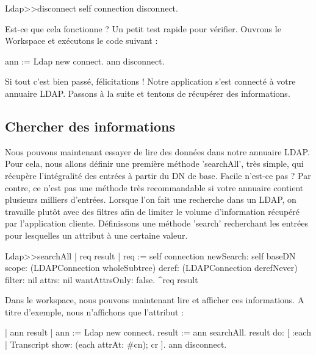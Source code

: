 \documentclass[a4paper,10pt,twoside]{book}
\begin{document}
\begin{code}{}
Ldap>>disconnect 
	self connection disconnect.
\end{code}


Est-ce que cela fonctionne ? Un petit test rapide pour v\'erifier. Ouvrons le Workspace et ex\'ecutons le code suivant :

\begin{code}{}
	ann := Ldap new connect. 
	ann disconnect.
\end{code}

Si tout c'est bien pass\'e, f\'elicitations ! Notre application s'est connect\'e \`a votre annuaire LDAP. Passons \`a la suite et tentons de r\'ecup\'erer des informations.


\subsection{Chercher des informations}



Nous pouvons maintenant essayer de lire des donn\'ees dans notre annuaire LDAP. Pour cela, nous allons d\'efinir une premi\`ere m\'ethode 'searchAll', tr\`es simple, qui r\'ecup\`ere l'int\'egralit\'e des entr\'ees \`a partir du DN de base.
Facile n'est-ce pas ? Par contre, ce n'est pas une m\'ethode tr\`es recommandable si votre annuaire contient plusieurs milliers d'entr\'ees. Lorsque l'on fait une recherche dans un LDAP, on travaille plut\^ot avec des filtres afin de limiter le volume d'information r\'ecup\'er\'e par l'application cliente.
D\'efinissons une m\'ethode 'search' recherchant les entr\'ees pour lesquelles un attribut \`a une certaine valeur.


\begin{code}{}
Ldap>>searchAll 
	| req result |
	req := self connection 
				newSearch: self baseDN 
				scope: (LDAPConnection wholeSubtree) 
				deref: (LDAPConnection derefNever) 
				filter: nil 
				attrs: nil 
				wantAttrsOnly: false.
	^req result
\end{code}

Dans le workspace, nous pouvons maintenant lire et afficher ces informations. A titre d'exemple, nous n'affichons que l'attribut  :

\begin{code}{}
	| ann result |
	ann := Ldap new connect. 
	result := ann searchAll. 
	result do: [ :each |
		Transcript show: (each attrAt: #cn); cr ]. 
	ann disconnect.
\end{code}
\end{document}

